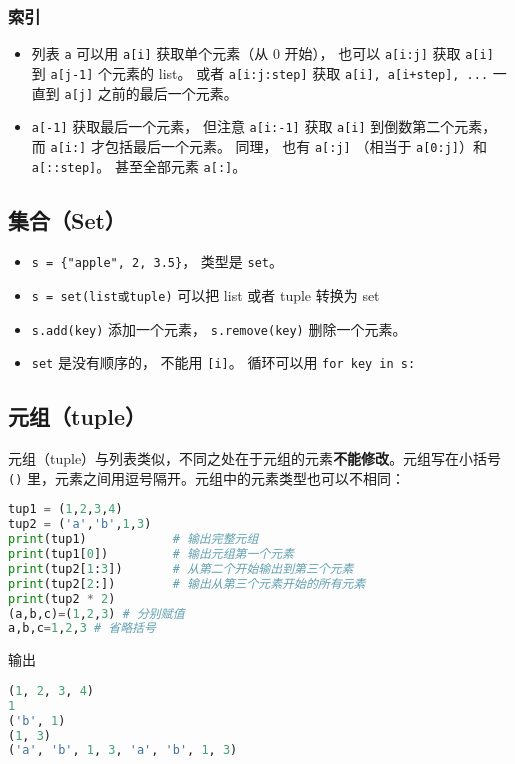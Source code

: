 \subsubsection{索引}
\begin{itemize}
\item 列表 \verb|a| 可以用 \verb|a[i]| 获取单个元素（从 0 开始）， 也可以 \verb|a[i:j]| 获取 \verb|a[i]| 到 \verb|a[j-1]| 个元素的 list。 或者 \verb|a[i:j:step]| 获取 \verb|a[i], a[i+step], ...| 一直到 \verb|a[j]| 之前的最后一个元素。 
\item \verb|a[-1]| 获取最后一个元素， 但注意 \verb|a[i:-1]| 获取 \verb|a[i]| 到倒数第二个元素， 而 \verb|a[i:]| 才包括最后一个元素。 同理， 也有 \verb|a[:j]| （相当于 \verb|a[0:j]|）和 \verb|a[::step]|。 甚至全部元素 \verb|a[:]|。
\end{itemize}


\subsection{集合（Set）}
\begin{itemize}
\item \verb|s = {"apple", 2, 3.5}|， 类型是 \verb|set|。 
\item \verb|s = set(list或tuple)| 可以把 list 或者 tuple 转换为 set
\item \verb|s.add(key)| 添加一个元素， \verb|s.remove(key)| 删除一个元素。
\item \verb|set| 是没有顺序的， 不能用 \verb|[i]|。 循环可以用 \verb|for key in s:|
\end{itemize}


\subsection{元组（tuple）}
元组（tuple）与列表类似，不同之处在于元组的元素\textbf{不能修改}。元组写在小括号 \verb|()| 里，元素之间用逗号隔开。元组中的元素类型也可以不相同：
\begin{lstlisting}[language=python]
tup1 = (1,2,3,4)
tup2 = ('a','b',1,3)
print(tup1)            # 输出完整元组
print(tup1[0])         # 输出元组第一个元素
print(tup2[1:3])       # 从第二个开始输出到第三个元素
print(tup2[2:])        # 输出从第三个元素开始的所有元素
print(tup2 * 2)
(a,b,c)=(1,2,3) # 分别赋值
a,b,c=1,2,3 # 省略括号
\end{lstlisting}
输出
\begin{lstlisting}[language=python]
(1, 2, 3, 4)
1
('b', 1)
(1, 3)
('a', 'b', 1, 3, 'a', 'b', 1, 3)
\end{lstlisting}

